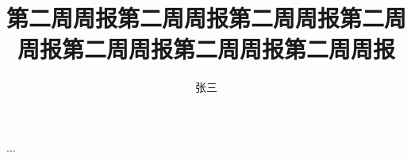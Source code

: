 \documentclass{upctrans}
\begin{document}

\title{第二周周报第二周周报第二周周报第二周周报第二周周报第二周周报第二周周报}
\author{张三}

\maketitle





...
\end{document}
